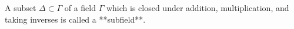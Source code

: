 A subset $\Delta \subset \Gamma$ of a field $\Gamma$ which is closed under addition, multiplication, and taking inverses is called a **subfield**.
